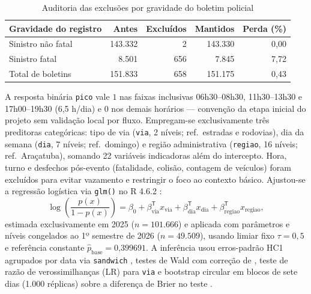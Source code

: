 \documentclass[
  article,
  12pt,
  oneside,
  a4paper,
  section=TITLE,
  english,
  brazil
]{abntex2}\usepackage[]{graphicx}\usepackage[]{xcolor}
\begin{document}
\begin{table}[htbp]
  \centering
  \SingleSpacing
  \caption{Auditoria das exclusões por gravidade do boletim policial}
  \label{tab:exclusoes}
  \footnotesize
  \renewcommand{\arraystretch}{0.92}

\begin{tabular}{lrrrr}
\toprule
Gravidade do registro & Antes & Excluídos & Mantidos & Perda (\%)\\
\midrule
Sinistro não fatal & 143.332 & 2 & 143.330 & 0,00\\
Sinistro fatal & 8.501 & 656 & 7.845 & 7,72\\
Total de boletins & 151.833 & 658 & 151.175 & 0,43\\
\bottomrule
\end{tabular}

\end{table}

A resposta binária \texttt{pico} vale $1$ nas faixas inclusivas 06h30--08h30, 11h30--13h30 e 17h00--19h30 (6,5 h/dia) e $0$ nos demais horários --- convenção da etapa inicial do projeto sem validação local por fluxo. Empregam-se exclusivamente três preditoras categóricas: tipo de via (\texttt{via}, 2 níveis; ref.\ estradas e rodovias), dia da semana (\texttt{dia}, 7 níveis; ref.\ domingo) e região administrativa (\texttt{regiao}, 16 níveis; ref.\ Araçatuba), somando 22 variáveis indicadoras além do intercepto. Hora, turno e desfechos pós-evento (fatalidade, colisão, contagem de veículos) foram excluídos para evitar vazamento e restringir o foco ao contexto básico. Ajustou-se a regressão logística via \texttt{glm()} no R 4.6.2 \parencite{rcore2026}:
\begin{equation}
  \log\!\left(\frac{p(x)}{1 - p(x)}\right) = \beta_0 + \beta_{\mathrm{via}}^{\mathsf{T}} x_{\mathrm{via}} + \beta_{\mathrm{dia}}^{\mathsf{T}} x_{\mathrm{dia}} + \beta_{\mathrm{regiao}}^{\mathsf{T}} x_{\mathrm{regiao}},
\end{equation}
estimada exclusivamente em 2025 ($n = \text{101.666}$) e aplicada com parâmetros e níveis congelados ao 1º semestre de 2026 ($n = \text{49.509}$), usando limiar fixo $\tau = 0{,}5$ \parencite{lones2024} e referência constante $\hat{p}_{\mathrm{base}} = \text{0,399691}$. A inferência usou erros-padrão HC1 agrupados por data via \texttt{sandwich} \parencite{zeileis2020}, testes de Wald com correção de \textcite{holm1979}, teste de razão de verossimilhanças (LR) para \texttt{via} e bootstrap circular em blocos de sete dias (1.000 réplicas) sobre a diferença de Brier no teste \parencite{politis1992,efron1993}.
\end{document}
